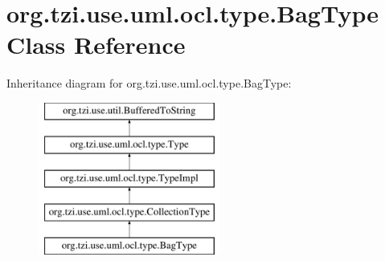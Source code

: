 \hypertarget{classorg_1_1tzi_1_1use_1_1uml_1_1ocl_1_1type_1_1_bag_type}{\section{org.\-tzi.\-use.\-uml.\-ocl.\-type.\-Bag\-Type Class Reference}
\label{classorg_1_1tzi_1_1use_1_1uml_1_1ocl_1_1type_1_1_bag_type}
}
Inheritance diagram for org.\-tzi.\-use.\-uml.\-ocl.\-type.\-Bag\-Type\-:\begin{figure}[H]
\begin{center}
\leavevmode
\includegraphics[height=5.000000cm]{classorg_1_1tzi_1_1use_1_1uml_1_1ocl_1_1type_1_1_bag_type}
\end{center}
\end{figure}

